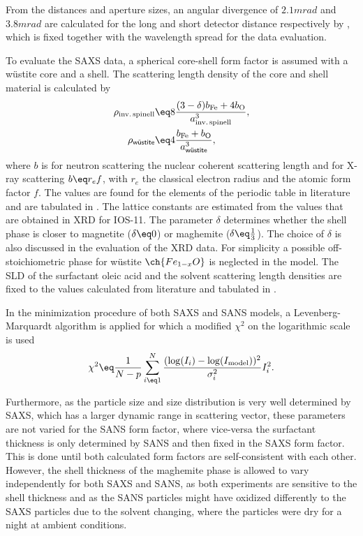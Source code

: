 \documentclass[\main/dresen_thesis.tex]{subfiles}
\begin{document}
    From the distances and aperture sizes, an angular divergence of $2.1 \unit{mrad}$ and $3.8 \unit{mrad}$ are calculated for the long and short detector distance respectively by , which is fixed together with the wavelength spread for the data evaluation.

    To evaluate the SAXS data, a spherical core-shell form factor is assumed with a w\"ustite core and a  shell.
    The scattering length density of the core and shell material is calculated by
    \begin{align}
      \rho_\mathrm{inv.\,spinell} &\eq   8 \frac{(3-\delta) b_\mathrm{Fe} + 4 b_\mathrm{O}}{a_\mathrm{inv.\,spinell}^3},\\
      \rho_\textsf{w\"ustite} &\eq   4 \frac{b_\mathrm{Fe} + b_\mathrm{O}}{a_\textsf{w\"ustite}^3},
    \end{align}
    where $b$ is for neutron scattering the nuclear coherent scattering length and for X-ray scattering $b \eq r_e f$, with $r_e$ the classical electron radius and the  atomic form factor $f$.
    The values are found for the elements of the periodic table in literature \cite{Sears_1992_Neutr, BerkeleyLab_1993_asf} and are tabulated in .
    The lattice constants are estimated from the values that are obtained in XRD for IOS-11.
    The parameter $\delta$ determines whether the shell phase is closer to magnetite ($\delta \eq 0$) or maghemite ($\delta \eq \tfrac{1}{3}$).
    The choice of $\delta$ is also discussed in the evaluation of the XRD data.
    For simplicity a possible off-stoichiometric phase for w\"ustite $\ch{Fe_{1-x}O}$ is neglected in the model.
    The SLD of the surfactant oleic acid and the solvent scattering length densities are fixed to the values calculated from literature and tabulated in .

    In the minimization procedure of both SAXS and SANS models, a Levenberg-Marquardt algorithm\cite{Marquardt_1963_Analgo, Oliphant_2006_Guide} is applied for which a modified $\chi^2$ on the logarithmic scale is used
    \begin{align}
      \chi^2 \eq \frac{1}{N-p} \sum_{i\eq 1}^{N} \frac{(\log(I_i) - \log(I_\mathrm{model}))^2}{\sigma_i^2} I^2_i.
    \end{align}

    Furthermore, as the particle size and size distribution is very well determined by SAXS, which has a larger dynamic range in scattering vector, these parameters are not varied for the SANS form factor, where vice-versa the surfactant thickness is only determined by SANS and then fixed in the SAXS form factor.
    This is done until both calculated form factors are self-consistent with each other.
    However, the shell thickness of the maghemite phase is allowed to vary independently for both SAXS and SANS, as both experiments are sensitive to the shell thickness and as the SANS particles might have oxidized differently to the SAXS particles due to the solvent changing, where the particles were dry for a night at ambient conditions.
\end{document}
